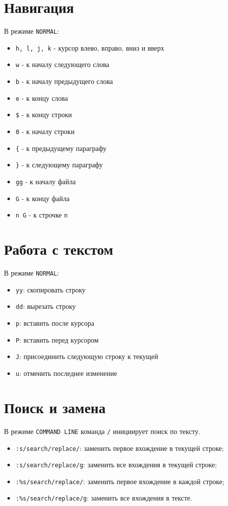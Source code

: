 \documentclass[12pt, a4paper]{article}
\begin{document}
\section{Навигация}
В режиме \texttt{NORMAL}:
\begin{itemize}
  \item \texttt{h, l, j, k} - курсор влево, вправо, вниз и вверх
  \item \texttt{w} - к началу следующего слова
  \item \texttt{b} - к началу предыдущего слова
  \item \texttt{e} - к концу слова
  \item \texttt{\$} - к концу строки
  \item \texttt{0} - к началу строки
  \item \texttt{\{} - к предыдущему параграфу
  \item \texttt{\}} - к следующему параграфу
  \item \texttt{gg} - к началу файла
  \item \texttt{G} - к концу файла
  \item \texttt{n G} - к строчке \texttt{n}
\end{itemize}

\section{Работа с текстом}
В режиме \texttt{NORMAL}:
\begin{itemize}
\item \texttt{yy}: скопировать строку
\item \texttt{dd}: вырезать строку
\item \texttt{p}: вставить после курсора
\item \texttt{P}: вставить перед курсором
\item \texttt{J}: присоединить следующую строку к текущей
\item \texttt{u}: отменить последнее изменение
\end{itemize}

\section{Поиск и замена}
В режиме \texttt{COMMAND LINE} команда \texttt{/} инициирует поиск по тексту.
\begin{itemize}
  \item \texttt{:s/search/replace/}: заменить первое вхождение в текущей строке;
  \item \texttt{:s/search/replace/g}: заменить все вхождения в текущей строке;
  \item \texttt{:\%s/search/replace/}: заменить первое вхождение в каждой строке;
  \item \texttt{:\%s/search/replace/g}: заменить все вхождения в тексте.
\end{itemize}
\end{document}
